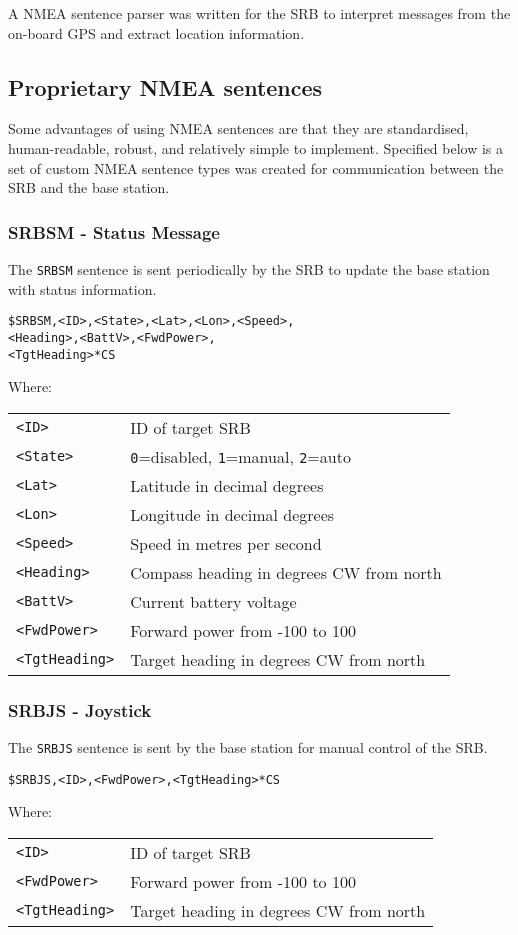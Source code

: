 \documentclass[a4paper]{IEEEtran}
\newenvironment{nmeaspec}[1]
{
\newcommand{\field}[2]{\texttt{##1} & ##2 \\}
\vspace{0.2cm}
\noindent\texttt{#1}
\vspace{0.2cm}

\noindent Where: \vspace{0.1cm}\\  \noindent
\vspace{0.2cm}
\begin{tabular}{ll}
}
{
\end{tabular}
}
\begin{document}
A NMEA sentence parser was written for the SRB to interpret messages from the on-board GPS and extract location information.

\subsection{Proprietary NMEA sentences}
Some advantages of using NMEA sentences are that they are standardised, human-readable, robust, and relatively simple to implement. Specified below is a set of custom NMEA sentence types was created for communication between the SRB and the base station.

\subsubsection{SRBSM - Status Message}
The \texttt{SRBSM} sentence is sent periodically by the SRB to update the base station with status information.

\begin{nmeaspec}{\$SRBSM,<ID>,<State>,<Lat>,<Lon>,<Speed>,\\<Heading>,<BattV>,<FwdPower>,\\<TgtHeading>*CS}
\field{<ID>}{ID of target SRB}
\field{<State>}{\texttt{0}=disabled, \texttt{1}=manual, \texttt{2}=auto}
\field{<Lat>}{Latitude in decimal degrees}
\field{<Lon>}{Longitude in decimal degrees}
\field{<Speed>}{Speed in metres per second}
\field{<Heading>}{Compass heading in degrees CW from north}
\field{<BattV>}{Current battery voltage}
\field{<FwdPower>}{Forward power from -100 to 100}
\field{<TgtHeading>}{Target heading in degrees CW from north}
\end{nmeaspec}

\subsubsection{SRBJS - Joystick}
The \texttt{SRBJS} sentence is sent by the base station for manual control of the SRB.

\begin{nmeaspec}{\$SRBJS,<ID>,<FwdPower>,<TgtHeading>*CS}
\field{<ID>}{ID of target SRB}
\field{<FwdPower>}{Forward power from -100 to 100}
\field{<TgtHeading>}{Target heading in degrees CW from north}
\end{nmeaspec}



\end{document}
